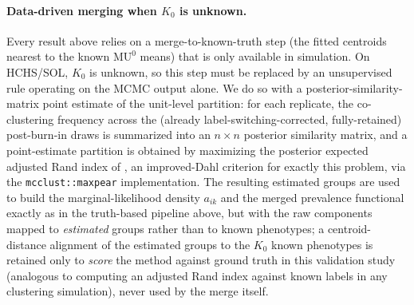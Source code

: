 \documentclass[11pt]{article}
\begin{document}
\begin{table}[h]
\centering
\small
{}
\caption{Validation results under the revised phenotype-probability clustering design ($c=0.3$), jackknife-based Godambe correction with full-chain retention, \emph{with} the design-degrees-of-freedom adjustment ($c_{\text{corr}} = M/(M-H)$ scaling of $\hat\Sigma_{\text{sandwich}}$ and a $t_{M-H}$ credible-interval critical value; $n=1{,}000$ Monte Carlo replicates). Mean $K_{\text{raw}} = 6.0$.}
\label{tab:cluster-probs-corrected}
\end{table}

\paragraph{Data-driven merging when $K_0$ is unknown.} Every result above relies on a merge-to-known-truth step (the fitted centroids nearest to the known $\text{MU}^0$ means) that is only available in simulation. On HCHS/SOL, $K_0$ is unknown, so this step must be replaced by an unsupervised rule operating on the MCMC output alone. We do so with a posterior-similarity-matrix point estimate of the unit-level partition: for each replicate, the co-clustering frequency across the (already label-switching-corrected, fully-retained) post-burn-in draws is summarized into an $n\times n$ posterior similarity matrix, and a point-estimate partition is obtained by maximizing the posterior expected adjusted Rand index of \citet{fritschickstadt2009}, an improved-Dahl criterion for exactly this problem, via the \texttt{mcclust::maxpear} implementation. The resulting estimated groups are used to build the marginal-likelihood density $a_{ik}$ and the merged prevalence functional exactly as in the truth-based pipeline above, but with the raw components mapped to \emph{estimated} groups rather than to known phenotypes; a centroid-distance alignment of the estimated groups to the $K_0$ known phenotypes is retained only to \emph{score} the method against ground truth in this validation study (analogous to computing an adjusted Rand index against known labels in any clustering simulation), never used by the merge itself.
\end{document}
